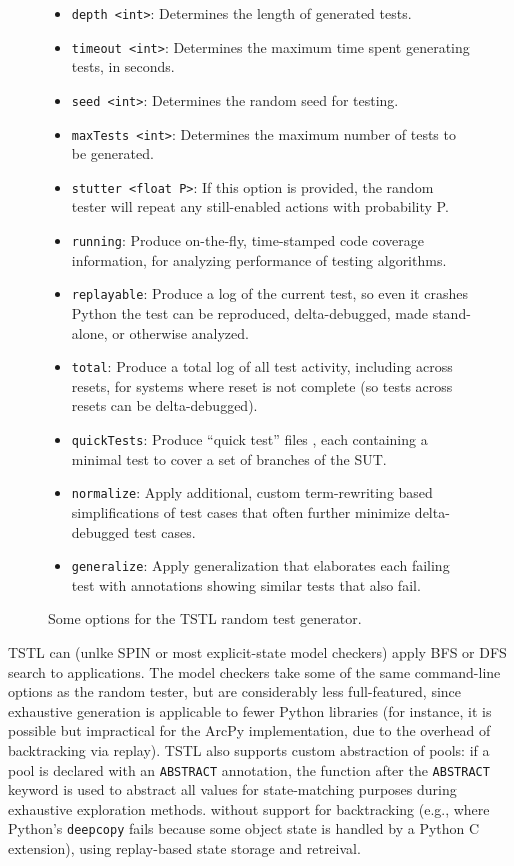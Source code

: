 \begin{figure}
{\scriptsize
\begin{itemize}
\item {\tt depth <int>}: Determines the length of generated tests.
\item {\tt timeout <int>}: Determines the maximum time spent generating tests, in seconds.
\item {\tt seed <int>}: Determines the random seed for testing.
\item {\tt maxTests <int>}: Determines the maximum number of tests to be generated.
\item {\tt stutter <float P>}: If this option is provided, the random tester will repeat any still-enabled actions with probability P.
\item {\tt running}: Produce on-the-fly, time-stamped code coverage information, for analyzing performance of testing algorithms. 
\item {\tt replayable}: Produce a log of the current test, so even it crashes Python the test can be reproduced, delta-debugged, made stand-alone, or otherwise analyzed.
\item {\tt total}: Produce a total log of all test activity, including across resets, for systems where reset is not complete (so tests across resets can be delta-debugged).
\item {\tt quickTests}:  Produce ``quick test'' files \cite{icst14}, each containing a minimal test to cover a set of branches of the SUT. 
\item {\tt normalize}: Apply additional, custom term-rewriting based simplifications of test cases that often further minimize delta-debugged test cases. 
\item {\tt generalize}: Apply generalization that elaborates each failing test with annotations showing similar tests that also fail. 
\end{itemize}
}
\caption{Some options for the TSTL random test generator.}
\label{tab:rt}
\end{figure}

TSTL can (unlke SPIN or most explicit-state model checkers) apply BFS or DFS search to applications.   The model checkers take some of the same command-line options as the random tester, but are considerably less full-featured, since exhaustive generation is applicable to fewer Python libraries (for instance, it is possible but impractical for the ArcPy implementation, due to the overhead of backtracking via replay).  TSTL also supports custom abstraction of pools:  if a pool is declared with an {\tt ABSTRACT} annotation, the function after the {\tt ABSTRACT} keyword is used to abstract all values for state-matching purposes during exhaustive exploration methods.  without support for backtracking (e.g., where Python's {\tt deepcopy} fails because some object state is handled by a Python C extension), using replay-based state storage and retreival.

